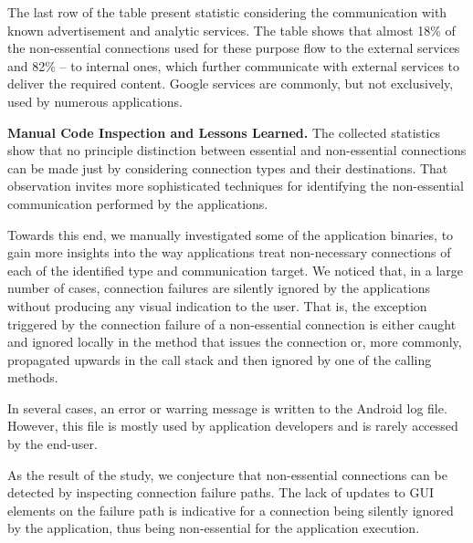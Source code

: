The last row of the table present statistic considering the communication with known advertisement and analytic services. The table shows that almost 18\% of the non-essential connections used for these purpose flow to the external services and 82\% -- to internal ones, which further communicate with external services to deliver the required content. 
Google services are commonly, but not exclusively, used by numerous applications. 


\vspace{0.1in}
\noindent 
{\bf Manual Code Inspection and Lessons Learned.}
The collected statistics show that no principle distinction between essential and non-essential connections  
can be made just by considering connection types and their destinations. That observation invites more sophisticated 
techniques for identifying the non-essential communication performed by the applications. 

Towards this end, we manually investigated some of the application binaries, to gain more insights into the way applications treat non-necessary connections of each of the identified type and communication target. 
We noticed that, in a large number of cases, connection failures are silently ignored by the applications without producing any visual indication to the user. 
That is, the exception triggered by the connection failure of a non-essential connection is either caught and ignored locally in the method that issues the connection or, more commonly, propagated upwards in the call stack and then ignored by one of the calling methods. 

In several cases, an error or warring message is written to the Android log file. However, this file is mostly used by  application developers and is rarely accessed by the end-user.

As the result of the study, we conjecture that non-essential connections can be detected by inspecting connection failure paths. The lack of updates to GUI elements on the failure path is indicative for a connection being silently ignored by the application, thus being non-essential for the application execution.










